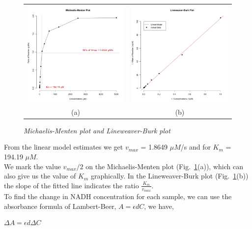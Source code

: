 \documentclass[a4paper,10pt]{article}
\begin{document}
                \begin{figure}[H]
                    \centering
                    \begin{tabular}{cc}
                        \includegraphics[width=220px]{../resources/kinetics_mmplot.png} &
                        \includegraphics[width=220px]{../resources/kinetics_lbplot.png} \\
                        (a) & (b)\\
                    \end{tabular}
                    \caption{\it Michaelis-Menten plot and Lineweaver-Burk plot}\label{fig:mm_plot}
                \end{figure}

                \noindent From the linear model estimates we get $v_{max}$ = 1.8649 $\mu M$/s and for $K_m$ = 194.19 $\mu M$.\\
                We mark the value $v_{max}/2$ on the Michaelis-Menten plot (Fig.~\ref{fig:mm_plot}(a)), which can
                also give us the value of $K_m$ graphically. 
                In the Lineweaver-Burk plot (Fig.~\ref{fig:mm_plot}(b)) the slope of the fitted line indicates 
                the ratio $\frac{K_m}{v_{max}}$.\\

                To find the change in NADH concentration for each sample, we can use the absorbance formula
                of Lambert-Beer, $A = \epsilon d C$, we have,
                \begin{center}
                    $\Delta A = \epsilon d \Delta C$
                \end{center}
\end{document}
